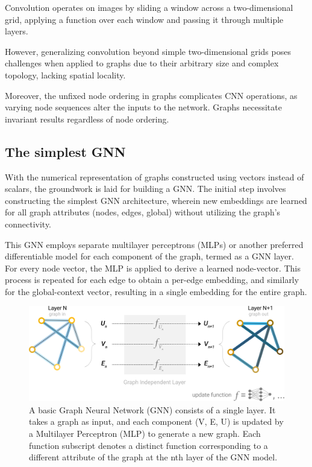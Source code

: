 Convolution operates on images by sliding a window across a two-dimensional grid, applying a function over each window and passing it through multiple layers.

However, generalizing convolution beyond simple two-dimensional grids poses challenges when applied to graphs due to their arbitrary size and complex topology, lacking spatial locality.

Moreover, the unfixed node ordering in graphs complicates CNN operations, as varying node sequences alter the inputs to the network. Graphs necessitate invariant results regardless of node ordering.


\subsection{The simplest GNN}
\hspace{\parindent}
With the numerical representation of graphs constructed using vectors instead of scalars, the groundwork is laid for building a GNN. The initial step involves constructing the simplest GNN architecture, wherein new embeddings are learned for all graph attributes (nodes, edges, global) without utilizing the graph's connectivity.

This GNN employs separate multilayer perceptrons (MLPs) or another preferred differentiable model for each component of the graph, termed as a GNN layer. For every node vector, the MLP is applied to derive a learned node-vector. This process is repeated for each edge to obtain a per-edge embedding, and similarly for the global-context vector, resulting in a single embedding for the entire graph.

\begin{figure}[H]
  \centering
  \includegraphics[width=0.7\linewidth]{basis-gnn.png}
  \caption{A basic Graph Neural Network (GNN) consists of a single layer. It takes a graph as input, and each component (V, E, U) is updated by a Multilayer Perceptron (MLP) to generate a new graph. Each function subscript denotes a distinct function corresponding to a different attribute of the graph at the nth layer of the GNN model.}
  \label{fig:usecase}
\end{figure}

